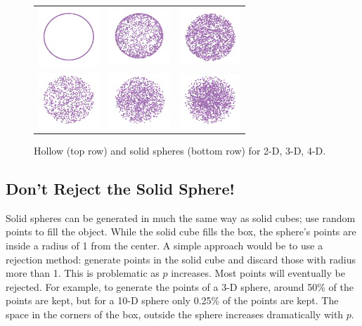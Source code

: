 \begin{figure}[ht]
\centering
\begin{tabular}{c c c}
\includegraphics[width=0.9in]{fig/sphere-2.pdf}
&\includegraphics[width=0.9in]{fig/sphere-3.pdf}
&\includegraphics[width=0.9in]{fig/sphere-4.pdf}
\\
\includegraphics[width=0.9in]{fig/sphere-2-solid.pdf}
&\includegraphics[width=0.9in]{fig/sphere-3-solid.pdf}
&\includegraphics[width=0.9in]{fig/sphere-4-solid.pdf}
\end{tabular}
\caption{Hollow (top row) and solid spheres (bottom row) for 2-D, 3-D,
  4-D.}
\label{holsolidsphere}
\end{figure}

\subsection{Don't Reject the Solid Sphere!}

Solid spheres can be generated in much the same way as solid cubes; use
random points to fill the object. While the solid cube fills the box,
the sphere's points are inside a radius of 1 from the center. A simple
approach would be to use a rejection method: generate points in the
solid cube and discard those with radius more than 1. This is
problematic as $p$ increases. Most points will eventually be rejected.
For example, to generate the points of a 3-D sphere, around 50\% of
the points are kept, but for a 10-D sphere only 0.25\% of the points
are kept. The space in the corners of the box, outside the sphere
increases dramatically with $p$.

